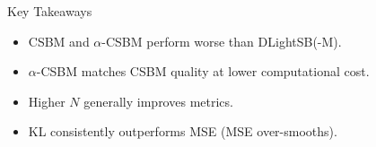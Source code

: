 \documentclass[final]{beamer}
\newlength{\sepwidth}
\newlength{\colwidth}
\newcommand{\separatorcolumn}{\begin{column}{\sepwidth}\end{column}}
\begin{document}
\begin{frame}[t]
\begin{columns}[t]
\begin{column}{\colwidth}
\begin{exampleblock}{Key Takeaways}
\begin{minipage}[t]{0.31\linewidth}
        \begin{itemize}\setlength{\itemindent}{0pt}
          \item CSBM and $\alpha$-CSBM perform {\color{Orange}worse} than DLightSB(-M).
          \item $\alpha$-CSBM matches CSBM quality at {\color{Green}lower computational cost}.
          \item Higher $N$ generally improves metrics.
          \item KL consistently {\color{Green}outperforms} MSE (MSE over-smooths).
        \end{itemize}
        \end{minipage}
    \end{exampleblock}

\end{column}

\separatorcolumn
\end{columns}
\end{frame}
\end{document}
